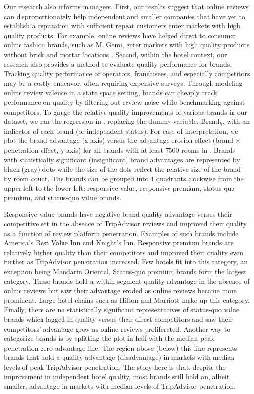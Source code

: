 \documentclass[mksc,blindrev]{informs3} %
\begin{document}
Our research also informs managers. First, our results suggest that online reviews can disproportionately help independent and smaller companies that have yet to establish a reputation with sufficient repeat customers enter markets with high quality products. For example, online reviews have helped direct to consumer online fashion brands, such as M. Gemi, enter markets with high quality products without brick and mortar locations . Second, within the hotel context, our research also provides a method to evaluate quality performance for brands. Tracking quality performance of operators, franchisees, and especially competitors may be a costly endeavor, often requiring expensive surveys. Through modeling online review valence in a state space setting, brands can cheaply track performance on quality by filtering out review noise while benchmarking against competitors. To gauge the relative quality improvements of various brands in our dataset, we ran the regression in , replacing the dummy variable, $\text{Brand}_h$, with an indicator of each brand (or independent status). For ease of interpretation, we plot the brand advantage (x-axis) versus the advantage erosion effect (brand $\times$ penetration effect, y-axis) for all brands with at least 7500 rooms in . Brands with statistically significant (insignficant) brand advantages are represented by black (gray) dots while the size of the dots reflect the relative size of the brand by room count. The brands can be grouped into 4 quadrants clockwise from the upper left to the lower left: responsive value, responsive premium, status-quo premium, and status-quo value brands.

Responsive value brands have negative brand quality advantage versus their competitive set in the absence of TripAdvisor reviews and improved their quality as a function of review platform penetration. Examples of such brands include America's Best Value Inn and Knight's Inn. Responsive premium brands are relatively higher quality than their competitors and improved their quality even further as TripAdvisor penetration increased. Few hotels fit into this category, an exception being Mandarin Oriental. Status-quo premium brands form the largest category. These brands hold a within-segment quality advantage in the absence of online reviews but saw their advantage eroded as online reviews became more prominent. Large hotel chains such as Hilton and Marriott make up this category. Finally, there are no statistically significant representatives of status-quo value brands which lagged in quality versus their direct competitors and saw their competitors' advantage grow as online reviews proliferated. Another way to categorize brands is by splitting the plot in half with the median peak penetration zero-advantage line. The region above (below) this line represents brands that hold a quality advantage (disadvantage) in markets with median levels of peak TripAdvisor penetration. The story here is that, despite the improvement in independent hotel quality, most brands still hold an, albeit smaller, advantage in markets with median levels of TripAdvisor penetration.
\end{document}
